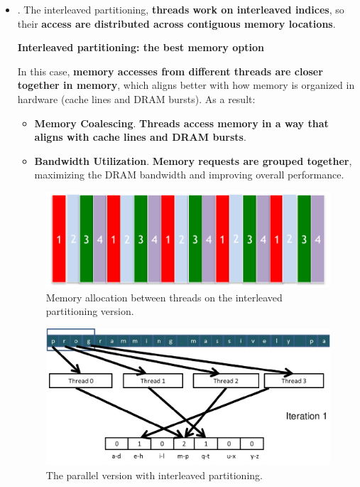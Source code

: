 \begin{itemize}
    \item {}. The interleaved partitioning, \textbf{threads work on interleaved indices}, so their \textbf{access are distributed across contiguous memory locations}.
    \begin{flushleft}
        \textcolor{Green3}{ \textbf{Interleaved partitioning: the best memory option}}
    \end{flushleft}
    In this case, \textbf{memory accesses from different threads are closer together in memory}, which aligns better with how memory is organized in hardware (cache lines and DRAM bursts). As a result:
    \begin{itemize}[label=\textcolor{Green3}{}]
        \item \textcolor{Green3}{\textbf{Memory Coalescing}}. \textbf{Threads access memory in a way that aligns with cache lines and DRAM bursts}.
        \item \textcolor{Green3}{\textbf{Bandwidth Utilization}}. \textbf{Memory requests are grouped together}, maximizing the DRAM bandwidth and improving overall performance.
    \end{itemize}
    \newpage
    \begin{figure}[!htp]
        \centering
        \includegraphics[width=.6\textwidth]{img/histogram-pattern-3.pdf}
        \caption{Memory allocation between threads on the interleaved partitioning version.}
    \end{figure}
    \begin{figure}[!htp]
        \centering
        \includegraphics[width=\textwidth]{img/histogram-pattern-4.pdf}
        \caption{The parallel version with interleaved partitioning.}
    \end{figure}
\end{itemize}

